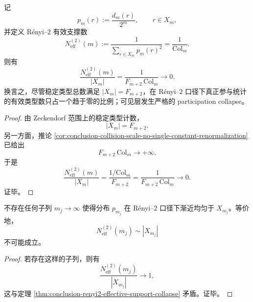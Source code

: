 \begin{theorem}\label{thm:conclusion-renyi2-effective-support-collapse}
记
\[
p_m(r):=\frac{d_m(r)}{2^m},
\qquad
r\in X_m,
\]
并定义 Rényi--\(2\) 有效支撑数
\[
N_{\mathrm{eff}}^{(2)}(m)
:=
\frac{1}{\sum_{r\in X_m}p_m(r)^2}
=
\frac{1}{\mathrm{Col}_m}.
\]
则有
\[
\frac{N_{\mathrm{eff}}^{(2)}(m)}{|X_m|}
=
\frac{1}{F_{m+2}\,\mathrm{Col}_m}
\longrightarrow 0.
\]
换言之，尽管稳定类型总数满足 \(|X_m|=F_{m+2}\)，在 Rényi--\(2\) 口径下真正参与统计的有效类型数只占一个趋于零的比例；可见层发生严格的 participation collapse。
\end{theorem}
\begin{proof}
由 Zeckendorf 范围上的稳定类型计数，
\[
|X_m|=F_{m+2}.
\]
另一方面，推论 \ref{cor:conclusion-collision-scale-no-single-constant-renormalization} 已给出
\[
F_{m+2}\,\mathrm{Col}_m\longrightarrow+\infty.
\]
于是
\[
\frac{N_{\mathrm{eff}}^{(2)}(m)}{|X_m|}
=
\frac{1/\mathrm{Col}_m}{F_{m+2}}
=
\frac{1}{F_{m+2}\,\mathrm{Col}_m}
\longrightarrow 0.
\]
证毕。
\end{proof}

\begin{corollary}\label{cor:conclusion-renyi2-no-asymptotic-uniformization-subsequence}
不存在任何子列 \(m_j\to\infty\) 使得分布 \(p_{m_j}\) 在 Rényi--\(2\) 口径下渐近均匀于 \(X_{m_j}\)。等价地，
\[
N_{\mathrm{eff}}^{(2)}(m_j)\sim |X_{m_j}|
\]
不可能成立。
\end{corollary}
\begin{proof}
若存在这样的子列，则有
\[
\frac{N_{\mathrm{eff}}^{(2)}(m_j)}{|X_{m_j}|}\longrightarrow 1,
\]
这与定理 \ref{thm:conclusion-renyi2-effective-support-collapse} 矛盾。证毕。
\end{proof}
